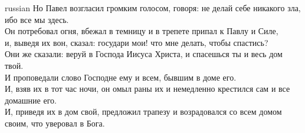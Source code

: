 \documentclass[10pt]{article} %
\begin{document}
{\begin{minipage}[t]{0.48\textwidth}
\begin{otherlanguage*}{russian}
Но Павел возгласил громким голосом, говоря: не делай себе никакого зла, ибо все мы здесь.
\\
Он потребовал огня, вбежал в темницу и в трепете припал к Павлу и Силе,
\\
и, выведя их вон, сказал: государи мои! что мне делать, чтобы спастись?
\\
Они же сказали: веруй в Господа Иисуса Христа, и спасешься ты и весь дом твой.
\\
И проповедали слово Господне ему и всем, бывшим в доме его.
\\
И, взяв их в тот час ночи, он омыл раны их и немедленно крестился сам и все домашние его.
\\
И, приведя их в дом свой, предложил трапезу и возрадовался со всем домом своим, что уверовал в Бога.
\\

\end{otherlanguage*}
\end{minipage}
\hfill
\begin{minipage}[t]{0.49\textwidth}


\end{minipage}}
\end{document}
